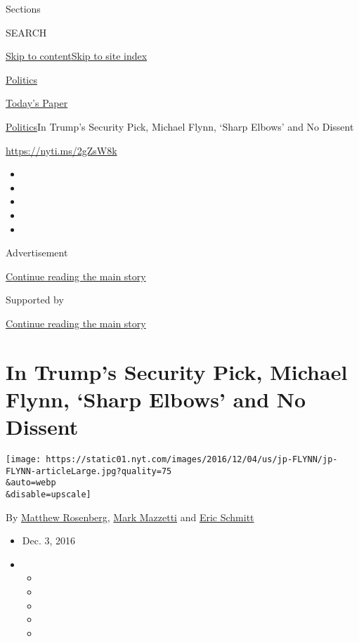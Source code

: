 Sections

SEARCH

\protect\hyperlink{site-content}{Skip to
content}\protect\hyperlink{site-index}{Skip to site index}

\href{https://www.nytimes.com/section/politics}{Politics}

\href{https://myaccount.nytimes.com/auth/login?response_type=cookie\&client_id=vi}{}

\href{https://www.nytimes.com/section/todayspaper}{Today's Paper}

\href{/section/politics}{Politics}\textbar{}In Trump's Security Pick,
Michael Flynn, `Sharp Elbows' and No Dissent

\url{https://nyti.ms/2gZsW8k}

\begin{itemize}
\item
\item
\item
\item
\item
\end{itemize}

Advertisement

\protect\hyperlink{after-top}{Continue reading the main story}

Supported by

\protect\hyperlink{after-sponsor}{Continue reading the main story}

\hypertarget{in-trumps-security-pick-michael-flynn-sharp-elbows-and-no-dissent}{%
\section{In Trump's Security Pick, Michael Flynn, `Sharp Elbows' and No
Dissent}\label{in-trumps-security-pick-michael-flynn-sharp-elbows-and-no-dissent}}

\texttt{[image: https://static01.nyt.com/images/2016/12/04/us/jp-FLYNN/jp-FLYNN-articleLarge.jpg?quality=75\\\&auto=webp\\\&disable=upscale]}

By \href{http://www.nytimes.com/by/matthew-rosenberg}{Matthew
Rosenberg}, \href{http://www.nytimes.com/by/mark-mazzetti}{Mark
Mazzetti} and \href{http://www.nytimes.com/by/eric-schmitt}{Eric
Schmitt}

\begin{itemize}
\item
  Dec. 3, 2016
\item
  \begin{itemize}
  \item
  \item
  \item
  \item
  \item
  \end{itemize}
\end{itemize}

